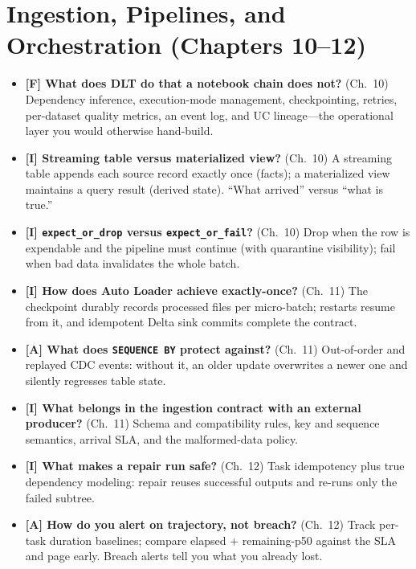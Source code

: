 \section{Ingestion, Pipelines, and Orchestration (Chapters 10--12)}
%
\begin{itemize}
    \item \textbf{[F] What does DLT do that a notebook chain does not?} (Ch.~10) Dependency
    inference, execution-mode management, checkpointing, retries, per-dataset quality metrics,
    an event log, and UC lineage---the operational layer you would otherwise hand-build.
    \item \textbf{[I] Streaming table versus materialized view?} (Ch.~10) A streaming table
    appends each source record exactly once (facts); a materialized view maintains a query
    result (derived state). ``What arrived'' versus ``what is true.''
    \item \textbf{[I] \texttt{expect\_or\_drop} versus \texttt{expect\_or\_fail}?} (Ch.~10)
    Drop when the row is expendable and the pipeline must continue (with quarantine
    visibility); fail when bad data invalidates the whole batch.
    \item \textbf{[I] How does Auto Loader achieve exactly-once?} (Ch.~11) The checkpoint
    durably records processed files per micro-batch; restarts resume from it, and idempotent
    Delta sink commits complete the contract.
    \item \textbf{[A] What does \texttt{SEQUENCE BY} protect against?} (Ch.~11) Out-of-order
    and replayed CDC events: without it, an older update overwrites a newer one and silently
    regresses table state.
    \item \textbf{[I] What belongs in the ingestion contract with an external producer?}
    (Ch.~11) Schema and compatibility rules, key and sequence semantics, arrival SLA, and the
    malformed-data policy.
    \item \textbf{[I] What makes a repair run safe?} (Ch.~12) Task idempotency plus true
    dependency modeling: repair reuses successful outputs and re-runs only the failed subtree.
    \item \textbf{[A] How do you alert on trajectory, not breach?} (Ch.~12) Track per-task
    duration baselines; compare elapsed $+$ remaining-p50 against the SLA and page early.
    Breach alerts tell you what you already lost.
\end{itemize}

